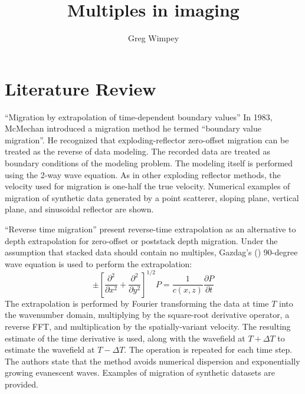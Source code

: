 \title{Multiples in imaging}
\author{Greg Wimpey}

\maketitle


\section{Literature Review}

``Migration by extrapolation of time-dependent boundary values'' In
1983, McMechan introduced a migration method he termed ``boundary
value migration''.  He recognized that exploding-reflector zero-offset
migration can be treated as the reverse of data modeling.  The
recorded data are treated as boundary conditions of the modeling
problem.  The modeling itself is performed using the 2-way wave
equation.  As in other exploding reflector methods, the velocity used
for migration is one-half the true velocity.  Numerical examples of
migration of synthetic data generated by a point scatterer, sloping
plane, vertical plane, and sinusoidal reflector are
shown. \citep{mcmechan83}

``Reverse time migration'' \citeauthor{baysaletal1983} present
reverse-time extrapolation as an alternative to depth extrapolation
for zero-offset or poststack depth migration.  Under the assumption
that stacked data should contain no multiples, Gazdag's
(\citeyear{gazdag81}) 90-degree wave equation is used to perform the
extrapolation:
\[\pm \left [ \frac{\partial^2}{\partial x^2} +
\frac{\partial^2}{\partial y^2} \right ]^{1/2} P = \frac{1}{c(x,z)}
\frac{\partial P}{\partial t}\] The extrapolation is performed by
Fourier transforming the data at time $T$ into the wavenumber domain,
multiplying by the square-root derivative operator, a reverse FFT, and
multiplication by the spatially-variant velocity. The resulting
estimate of the time derivative is used, along with the wavefield at
$T+ \Delta T$ to estimate the wavefield at $T- \Delta T$. The
operation is repeated for each time step. The authors state that the
method avoids numerical dispersion and exponentially growing
evanescent waves. Examples of migration of synthetic datasets are
provided.  \citep{baysaletal1983}

